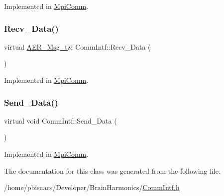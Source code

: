 Implemented in \mbox{\hyperlink{classMpiComm_a696c567ded2b842b368b82dee950de5b}{Mpi\+Comm}}.

\mbox{\label{classCommIntf_a910fdc340f2451051c492a7ee2803b84}} 
\subsubsection{\texorpdfstring{Recv\+\_\+\+Data()}{Recv\_Data()}}
{\footnotesize\ttfamily virtual \mbox{\hyperlink{structAER__Msg__t}{A\+E\+R\+\_\+\+Msg\+\_\+t}}\& Comm\+Intf\+::\+Recv\+\_\+\+Data (\begin{DoxyParamCaption}{ }\end{DoxyParamCaption})\hspace{0.3cm}{\ttfamily [pure virtual]}}



Implemented in \mbox{\hyperlink{classMpiComm_a9ff0e7421ac75131c2ce4f0bba8c2839}{Mpi\+Comm}}.

\mbox{\label{classCommIntf_a86cc885716df0db3a644b2db2e2a72bb}} 
\subsubsection{\texorpdfstring{Send\+\_\+\+Data()}{Send\_Data()}}
{\footnotesize\ttfamily virtual void Comm\+Intf\+::\+Send\+\_\+\+Data (\begin{DoxyParamCaption}\item[{\mbox{\hyperlink{structAER__Msg__t}{A\+E\+R\+\_\+\+Msg\+\_\+t}} const \&}]{ }\end{DoxyParamCaption})\hspace{0.3cm}{\ttfamily [pure virtual]}}



Implemented in \mbox{\hyperlink{classMpiComm_aa7615632d7ad06a163ea9d4fc641a85a}{Mpi\+Comm}}.



The documentation for this class was generated from the following file\+:\begin{DoxyCompactItemize}
\item 
/home/pbisaacs/\+Developer/\+Brain\+Harmonics/\mbox{\hyperlink{CommIntf_8h}{Comm\+Intf.\+h}}\end{DoxyCompactItemize}
